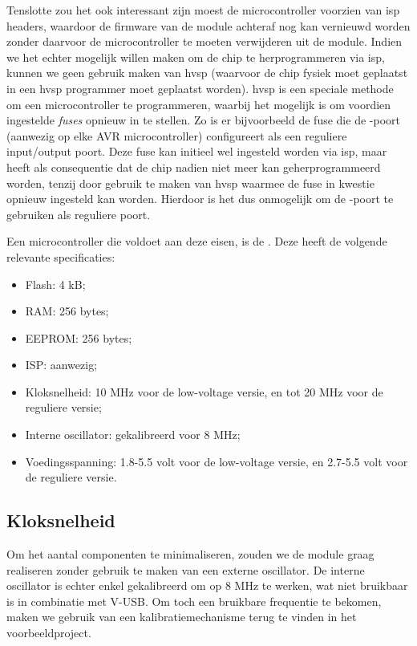 Tenslotte zou het ook interessant zijn moest de microcontroller voorzien van \ac{isp} headers, waardoor de firmware van de module achteraf nog kan vernieuwd worden zonder daarvoor de microcontroller te moeten verwijderen uit de module. Indien we het echter mogelijk willen maken om de chip te herprogrammeren via \ac{isp}, kunnen we geen gebruik maken van \ac{hvsp} (waarvoor de chip fysiek moet geplaatst in een \ac{hvsp} programmer moet geplaatst worden). \ac{hvsp} is een speciale methode om een microcontroller te programmeren, waarbij het mogelijk is om voordien ingestelde \emph{fuses} opnieuw in te stellen. Zo is er bijvoorbeeld de fuse die de -poort (aanwezig op elke AVR microcontroller) configureert als een reguliere input/output poort. Deze fuse kan initieel wel ingesteld worden via \ac{isp}, maar heeft als consequentie dat de chip nadien niet meer kan geherprogrammeerd worden, tenzij door gebruik te maken van \ac{hvsp} waarmee de fuse in kwestie opnieuw ingesteld kan worden. Hierdoor is het dus onmogelijk om de -poort te gebruiken als reguliere poort.

Een microcontroller die voldoet aan deze eisen, is de . Deze heeft de volgende relevante specificaties:
\begin{itemize}
\item Flash: 4 kB;
\item RAM: 256 bytes;
\item EEPROM: 256 bytes;
\item ISP: aanwezig;
\item Kloksnelheid: 10 MHz voor de low-voltage versie, en tot 20 MHz voor de reguliere versie;
\item Interne oscillator: gekalibreerd voor 8 MHz;
\item Voedingsspanning: 1.8-5.5 volt voor de low-voltage versie, en 2.7-5.5 volt voor de reguliere versie.
\end{itemize}

\subsection{Kloksnelheid}

Om het aantal componenten te minimaliseren, zouden we de module graag realiseren zonder gebruik te maken van een externe oscillator. De interne oscillator is echter enkel gekalibreerd om op 8 MHz te werken, wat niet bruikbaar is in combinatie met V-USB. Om toch een bruikbare frequentie te bekomen, maken we gebruik van een kalibratiemechanisme terug te vinden in het  voorbeeldproject.

